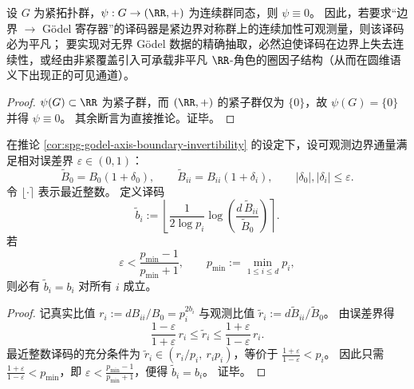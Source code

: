 \begin{theorem}[紧边界连续加性译码的平凡性]\label{thm:spg-compact-boundary-continuous-decoder-trivial}
设 \(G\) 为紧拓扑群，\(\psi:G\to(\RR,+)\) 为连续群同态，则 \(\psi\equiv 0\)。
因此，若要求“边界 \(\to\) Gödel 寄存器”的译码器是紧边界对称群上的连续加性可观测量，则该译码必为平凡；
要实现对无界 Gödel 数据的精确抽取，必然迫使译码在边界上失去连续性，或经由非紧覆盖引入可承载非平凡 \(\RR\)-角色的圈因子结构（从而在圆维语义下出现正的可见通道）。
\end{theorem}
\begin{proof}
\(\psi(G)\subset\RR\) 为紧子群，而 \((\RR,+)\) 的紧子群仅为 \(\{0\}\)，故 \(\psi(G)=\{0\}\) 并得 \(\psi\equiv 0\)。
其余断言为直接推论。证毕。
\end{proof}

\begin{theorem}\label{thm:spg-godel-boundary-decoding-relative-error-threshold}
在推论 \ref{cor:spg-godel-axis-boundary-invertibility} 的设定下，设可观测边界通量满足相对误差界 \(\varepsilon\in(0,1)\)：
\[
\widetilde B_0=B_0(1+\delta_0),
\qquad
\widetilde B_{ii}=B_{ii}(1+\delta_i),
\qquad
|\delta_0|,|\delta_i|\le \varepsilon.
\]
令 \(\lfloor \cdot\rceil\) 表示最近整数。
定义译码
\[
\widetilde b_i:=\left\lfloor \frac{1}{2\log p_i}\log\!\left(\frac{d\,\widetilde B_{ii}}{\widetilde B_0}\right)\right\rceil.
\]
若
\[
\varepsilon<\frac{p_{\min}-1}{p_{\min}+1},
\qquad
p_{\min}:=\min_{1\le i\le d}p_i,
\]
则必有 \(\widetilde b_i=b_i\) 对所有 \(i\) 成立。
\end{theorem}
\begin{proof}
记真实比值 \(r_i:=dB_{ii}/B_0=p_i^{2b_i}\) 与观测比值 \(\widetilde r_i:=d\widetilde B_{ii}/\widetilde B_0\)。
由误差界得
\[
\frac{1-\varepsilon}{1+\varepsilon}\,r_i
\le
\widetilde r_i
\le
\frac{1+\varepsilon}{1-\varepsilon}\,r_i.
\]
最近整数译码的充分条件为 \(\widetilde r_i\in(r_i/p_i,\ r_ip_i)\)，等价于
\(
\frac{1+\varepsilon}{1-\varepsilon}<p_i
\)。
因此只需 \(\frac{1+\varepsilon}{1-\varepsilon}<p_{\min}\)，即 \(\varepsilon<\frac{p_{\min}-1}{p_{\min}+1}\)，便得 \(\widetilde b_i=b_i\)。
证毕。
\end{proof}





